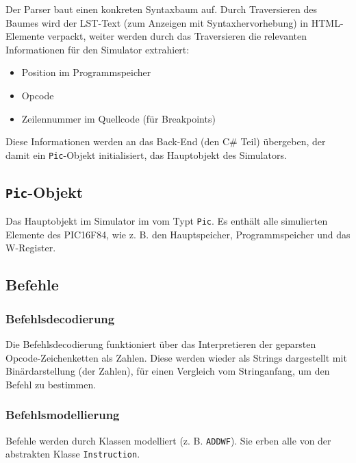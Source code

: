 
Der Parser baut einen konkreten Syntaxbaum auf.
Durch Traversieren des Baumes wird der LST-Text (zum Anzeigen mit Syntaxhervorhebung) in HTML-Elemente verpackt,
weiter werden durch das Traversieren die relevanten Informationen für den Simulator extrahiert:

\begin{itemize}
    \item Position im Programmspeicher
    \item Opcode 
    \item Zeilennummer im Quellcode (für Breakpoints)
\end{itemize}

Diese Informationen werden an das Back-End (den C\# Teil) übergeben,
der damit ein \texttt{Pic}-Objekt initialisiert, das Hauptobjekt des Simulators.

\subsection{\texttt{Pic}-Objekt}
Das Hauptobjekt im Simulator im vom Typt \texttt{Pic}.
Es enthält alle simulierten Elemente des PIC16F84,
wie z. B. den Hauptspeicher, Programmspeicher und das W-Register. 


\subsection{Befehle}

\subsubsection{Befehlsdecodierung}
Die Befehlsdecodierung funktioniert über das Interpretieren der geparsten Opcode-Zeichenketten als Zahlen.
Diese werden wieder als Strings dargestellt mit Binärdarstellung (der Zahlen),
für einen Vergleich vom Stringanfang, um den Befehl zu bestimmen.


\subsubsection{Befehlsmodellierung}
Befehle werden durch Klassen modelliert (z. B. \texttt{ADDWF}).
Sie erben alle von der abstrakten Klasse \texttt{Instruction}.

